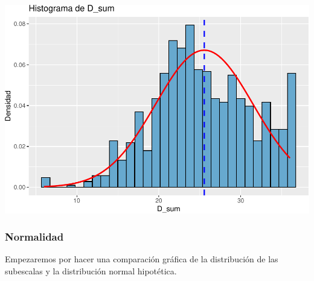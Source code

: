 \documentclass[
]{article}
\begin{document}
\includegraphics{Info_Dinix_02_files/figure-latex/30_Histos-10.pdf}

\subsubsection{Normalidad}\label{normalidad}

Empezaremos por hacer una comparación gráfica de la distribución de las
subescalas y la distribución normal hipotética.
\end{document}
